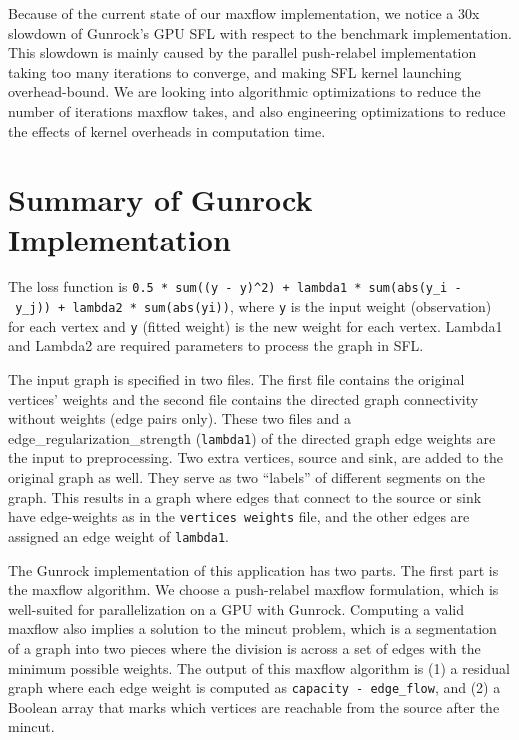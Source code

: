 \documentclass[10pt,oneside]{memoir}
\begin{document}
Because of the current state of our maxflow implementation, we notice a
30x slowdown of Gunrock's GPU SFL with respect to the benchmark
implementation. This slowdown is mainly caused by the parallel
push-relabel implementation taking too many iterations to converge, and
making SFL kernel launching overhead-bound. We are looking into
algorithmic optimizations to reduce the number of iterations maxflow
takes, and also engineering optimizations to reduce the effects of
kernel overheads in computation time.

\hypertarget{summary-of-gunrock-implementation-7}{%
\section{Summary of Gunrock
Implementation}\label{summary-of-gunrock-implementation-7}}

The loss function is
\texttt{0.5\ *\ sum((y\textquotesingle{}\ -\ y)\^{}2)\ +\ lambda1\ *\ sum(abs(y\_i\textquotesingle{}\ -\ y\_j\textquotesingle{}))\ +\ lambda2\ *\ sum(abs(yi\textquotesingle{}))},
where \texttt{y} is the input weight (observation) for each vertex and
\texttt{y\textquotesingle{}} (fitted weight) is the new weight for each
vertex. Lambda1 and Lambda2 are required parameters to process the graph
in SFL.

The input graph is specified in two files. The first file contains the
original vertices' weights and the second file contains the directed
graph connectivity without weights (edge pairs only). These two files
and a edge\_regularization\_strength (\texttt{lambda1}) of the directed
graph edge weights are the input to preprocessing. Two extra vertices,
source and sink, are added to the original graph as well. They serve as
two ``labels'' of different segments on the graph. This results in a
graph where edges that connect to the source or sink have edge-weights
as in the \texttt{vertices\textquotesingle{}\ weights} file, and the
other edges are assigned an edge weight of \texttt{lambda1}.

The Gunrock implementation of this application has two parts. The first
part is the maxflow algorithm. We choose a push-relabel maxflow
formulation, which is well-suited for parallelization on a GPU with
Gunrock. Computing a valid maxflow also implies a solution to the mincut
problem, which is a segmentation of a graph into two pieces where the
division is across a set of edges with the minimum possible weights. The
output of this maxflow algorithm is (1) a residual graph where each edge
weight is computed as \texttt{capacity\ -\ edge\_flow}, and (2) a
Boolean array that marks which vertices are reachable from the source
after the mincut.
\end{document}
